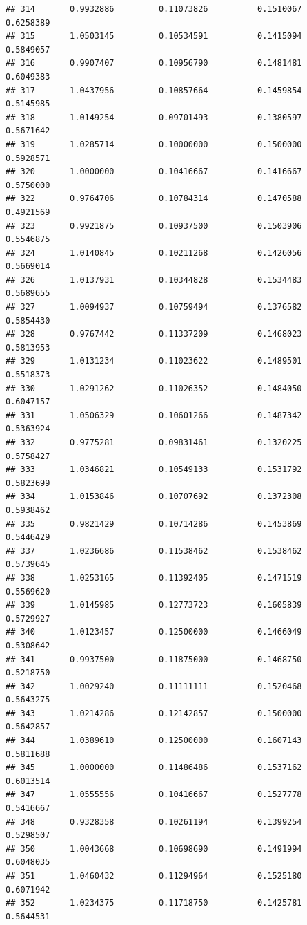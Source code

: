\documentclass[]{article}
\begin{document}
\begin{verbatim}
## 314       0.9932886         0.11073826          0.1510067        0.6258389
## 315       1.0503145         0.10534591          0.1415094        0.5849057
## 316       0.9907407         0.10956790          0.1481481        0.6049383
## 317       1.0437956         0.10857664          0.1459854        0.5145985
## 318       1.0149254         0.09701493          0.1380597        0.5671642
## 319       1.0285714         0.10000000          0.1500000        0.5928571
## 320       1.0000000         0.10416667          0.1416667        0.5750000
## 322       0.9764706         0.10784314          0.1470588        0.4921569
## 323       0.9921875         0.10937500          0.1503906        0.5546875
## 324       1.0140845         0.10211268          0.1426056        0.5669014
## 326       1.0137931         0.10344828          0.1534483        0.5689655
## 327       1.0094937         0.10759494          0.1376582        0.5854430
## 328       0.9767442         0.11337209          0.1468023        0.5813953
## 329       1.0131234         0.11023622          0.1489501        0.5518373
## 330       1.0291262         0.11026352          0.1484050        0.6047157
## 331       1.0506329         0.10601266          0.1487342        0.5363924
## 332       0.9775281         0.09831461          0.1320225        0.5758427
## 333       1.0346821         0.10549133          0.1531792        0.5823699
## 334       1.0153846         0.10707692          0.1372308        0.5938462
## 335       0.9821429         0.10714286          0.1453869        0.5446429
## 337       1.0236686         0.11538462          0.1538462        0.5739645
## 338       1.0253165         0.11392405          0.1471519        0.5569620
## 339       1.0145985         0.12773723          0.1605839        0.5729927
## 340       1.0123457         0.12500000          0.1466049        0.5308642
## 341       0.9937500         0.11875000          0.1468750        0.5218750
## 342       1.0029240         0.11111111          0.1520468        0.5643275
## 343       1.0214286         0.12142857          0.1500000        0.5642857
## 344       1.0389610         0.12500000          0.1607143        0.5811688
## 345       1.0000000         0.11486486          0.1537162        0.6013514
## 347       1.0555556         0.10416667          0.1527778        0.5416667
## 348       0.9328358         0.10261194          0.1399254        0.5298507
## 350       1.0043668         0.10698690          0.1491994        0.6048035
## 351       1.0460432         0.11294964          0.1525180        0.6071942
## 352       1.0234375         0.11718750          0.1425781        0.5644531

\end{verbatim}
\end{document}
